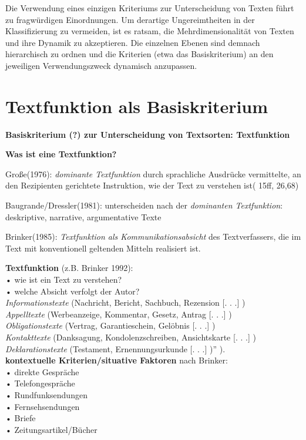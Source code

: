 \documentclass[
  letterpaper,
]{scrbook}
\begin{document}
Die Verwendung eines einzigen Kriteriums zur Unterscheidung von Texten
führt zu fragwürdigen Einordnungen. Um derartige Ungereimtheiten in der
Klassifizierung zu vermeiden, ist es ratsam, die Mehrdimensionalität von
Texten und ihre Dynamik zu akzeptieren. Die einzelnen Ebenen sind
demnach hierarchisch zu ordnen und die Kriterien (etwa das
Basiskriterium) an den jeweiligen Verwendungszweck dynamisch anzupassen.

\hypertarget{textfunktion-als-basiskriterium}{%
\section{Textfunktion als
Basiskriterium}\label{textfunktion-als-basiskriterium}}

\textbf{Basiskriterium (?) zur Unterscheidung von Textsorten:
Textfunktion}

\textbf{Was ist eine Textfunktion?}

Große(1976): \emph{dominante Textfunktion} durch sprachliche Ausdrücke
vermittelte, an den Rezipienten gerichtete Instruktion, wie der Text zu
verstehen ist( 15ff, 26,68)

Baugrande/Dressler(1981): unterscheiden nach der \emph{dominanten
Textfunktion}: deskriptive, narrative, argumentative Texte

Brinker(1985): \emph{Textfunktion als Kommunikationsabsicht} des
Textverfassers, die im Text mit konventionell geltenden Mitteln
realisiert ist.

\textbf{Textfunktion} (z.B. Brinker 1992):\\
• wie ist ein Text zu verstehen?\\
• welche Absicht verfolgt der Autor?\\
\emph{Informationstexte} (Nachricht, Bericht, Sachbuch, Rezension {[}. .
.{]} )\\
\emph{Appelltexte} (Werbeanzeige, Kommentar, Gesetz, Antrag {[}. . .{]}
)\\
\emph{Obligationstexte} (Vertrag, Garantieschein, Gelöbnis {[}. . .{]}
)\\
\emph{Kontakttexte} (Danksagung, Kondolenzschreiben, Ansichtskarte {[}.
. .{]} )\\
\emph{Deklarationstexte} (Testament, Ernennungsurkunde {[}. . .{]} )''
).\\

\textbf{kontextuelle Kriterien/situative Faktoren} nach Brinker:\\
• direkte Gespräche\\
• Telefongespräche\\
• Rundfunksendungen\\
• Fernsehsendungen\\
• Briefe\\
• Zeitungsartikel/Bücher\\
\end{document}
